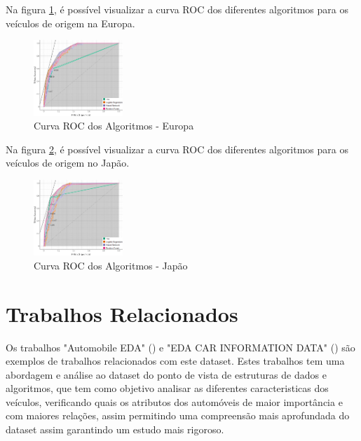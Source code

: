 \documentclass[conference]{IEEEtran}
\begin{document}
Na figura \ref{fig:roc_eu}, é possível visualizar a curva ROC dos diferentes algoritmos para os veículos de origem na Europa.
\begin{figure}[h]
	\centering
	\includegraphics[width=0.3\textwidth]{Resources/ROC_EU.png}
	\caption{Curva ROC dos Algoritmos - Europa}
	\label{fig:roc_eu}
\end{figure}
\newpage
Na figura \ref{fig:roc_jp}, é possível visualizar a curva ROC dos diferentes algoritmos para os veículos de origem no Japão.
\begin{figure}[h]
	\centering
	\includegraphics[width=0.3\textwidth]{Resources/ROC_JP.png}
	\caption{Curva ROC dos Algoritmos - Japão}
	\label{fig:roc_jp}
\end{figure}

\section{Trabalhos Relacionados}
Os trabalhos "Automobile EDA" (\cite{ref2}) e "EDA CAR INFORMATION DATA" (\cite{ref3}) são exemplos de trabalhos relacionados com este dataset.
Estes trabalhos tem uma abordagem e análise ao dataset do ponto de vista de estruturas de dados e algoritmos, que tem como objetivo analisar as
diferentes caracteristicas dos veículos, verificando quais os atributos dos automóveis de maior importância e com maiores relações, assim permitindo
uma compreensão mais aprofundada do dataset assim garantindo um estudo mais rigoroso.
\end{document}
